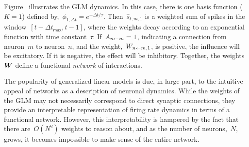 Figure~\TODO{} illustrates the GLM dynamics. In this case, there is
one basis function ($K=1$) defined
by,~${\phi_{1,\Delta t} = e^{-\Delta t/\tau}}$.
Then~$\widehat{s}_{t,m,1}$ is a weighted sum of spikes in the
window~$[t-\Delta t_{\mathsf{max}},t-1]$, where the weights decay
according to an exponential function with time constant~$\tau$.  
If~${A_{n \leftarrow m}=1}$, indicating a
connection from neuron~$m$ to neuron~$n$, and
the weight,~$W_{n \leftarrow m,1}$, is positive, the influence will be
excitatory. If it is negative, the effect will be inhibitory.
Together, the weights~$\boldsymbol{W}$ define a functional \emph{network} of
interactions.

The popularity of generalized linear models is due, in large part, to
the intuitive appeal of networks as a description of neuronal
dynamics.  While the weights of the GLM may not necessarily correspond
to direct synaptic connections, they provide an interpretable
representation of firing rate dynamics in terms of a functional
network. However, this interpretability is hampered by the fact that
there are~$O(N^2)$ weights to reason about, and as the number of
neurons,~$N$, grows, it becomes impossible to make sense of the entire
network.

